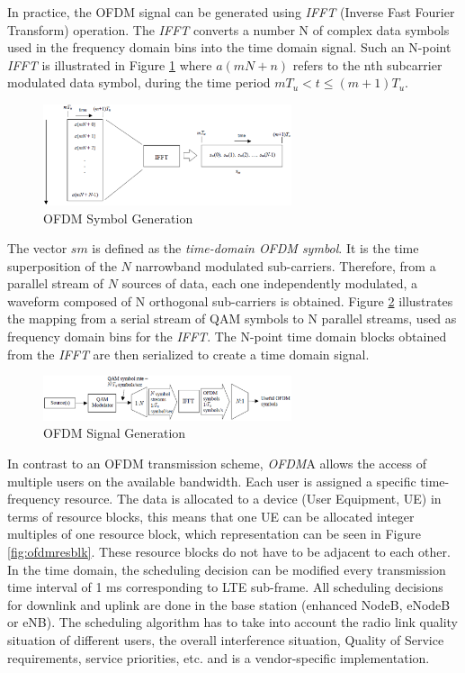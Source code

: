 In practice, the OFDM signal can be generated using \textit{IFFT} (Inverse Fast
Fourier Transform) operation. The \textit{IFFT} converts a number N of complex
data symbols used in the frequency domain bins into the time domain signal. Such
an N-point \textit{IFFT} is illustrated in Figure \ref{fig:ofdmsymbol} where
$a(mN+n)$ refers to the nth subcarrier modulated data symbol, during the time
period $mT_u < t \le (m+1)T_u$.

\begin{figure}[htbp]
    \centering
    \includegraphics[width=0.65\textwidth]{./figures/ofdm_symbol_gen}
    \caption{ OFDM Symbol Generation \cite{umtslte}
    \label{fig:ofdmsymbol}}
\end{figure}

The vector $sm$ is defined as the \emph{time-domain OFDM symbol}. It is the time
superposition of the $N$ narrowband modulated sub-carriers. Therefore, from a
parallel stream of $N$ sources of data, each one independently modulated, a
waveform composed of N orthogonal sub-carriers is obtained. Figure
\ref{fig:ofdmchain} illustrates the mapping from a serial stream of QAM symbols
to N parallel streams, used as frequency domain bins for the \textit{IFFT}. The
N-point time domain blocks obtained from the \textit{IFFT} are then serialized
to create a time domain signal.

\begin{figure}[htbp]
    \centering
    \includegraphics[width=0.65\textwidth]{./figures/ofdm_signal_chain}
    \caption{ OFDM Signal Generation \cite{umtslte}
    \label{fig:ofdmchain}}
\end{figure}

In contrast to an OFDM transmission scheme, \textit{OFDM}A allows the access of
multiple users on the available bandwidth. Each user is assigned a specific
time-frequency resource. The data is allocated to a device (User Equipment, UE)
in terms of resource blocks, this means that one UE can be allocated integer
multiples of one resource block, which representation can be seen in Figure
\ref{fig:ofdmresblk}. These resource blocks do not have to be adjacent to each
other. In the time domain, the scheduling decision can be modified every
transmission time interval of 1 ms corresponding to LTE sub-frame. All scheduling
decisions for downlink and uplink are done in the base station (enhanced NodeB,
eNodeB or eNB). The scheduling algorithm has to take into account the radio link
quality situation of different users, the overall interference situation,
Quality of Service requirements, service priorities, etc. and is a
vendor-specific implementation.

